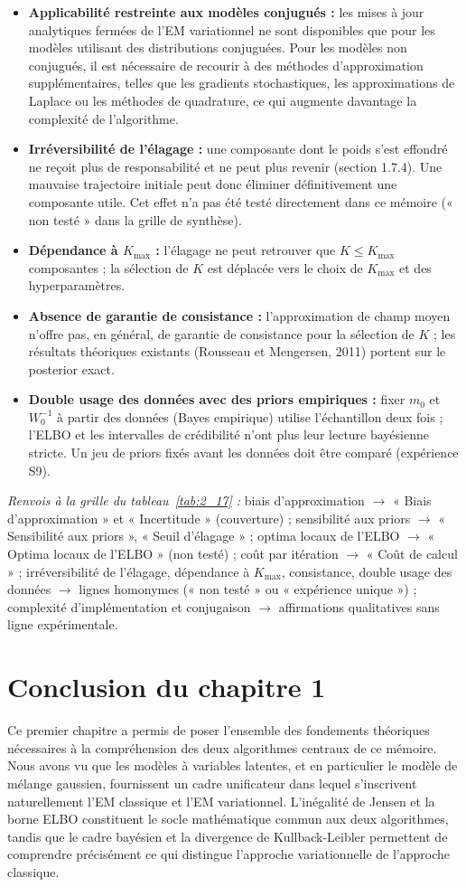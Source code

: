 \begin{itemize}
\item \textbf{Applicabilité restreinte aux modèles conjugués : }les mises à jour analytiques fermées de l'EM variationnel ne sont disponibles que pour les modèles utilisant des distributions conjuguées. Pour les modèles non conjugués, il est nécessaire de recourir à des méthodes d'approximation supplémentaires, telles que les gradients stochastiques, les approximations de Laplace ou les méthodes de quadrature, ce qui augmente davantage la complexité de l'algorithme.
\item \textbf{Irréversibilité de l'élagage : }une composante dont le poids s'est effondré ne reçoit plus de responsabilité et ne peut plus revenir (section 1.7.4). Une mauvaise trajectoire initiale peut donc éliminer définitivement une composante utile. Cet effet n'a pas été testé directement dans ce mémoire (« non testé » dans la grille de synthèse).
\item \textbf{Dépendance à $K_{\max}$ : }l'élagage ne peut retrouver que $K \leq K_{\max}$ composantes ; la sélection de $K$ est déplacée vers le choix de $K_{\max}$ et des hyperparamètres.
\item \textbf{Absence de garantie de consistance : }l'approximation de champ moyen n'offre pas, en général, de garantie de consistance pour la sélection de $K$ ; les résultats théoriques existants (Rousseau et Mengersen, 2011) portent sur le posterior exact.
\item \textbf{Double usage des données avec des priors empiriques : }fixer $m_0$ et $W_0^{-1}$ à partir des données (Bayes empirique) utilise l'échantillon deux fois ; l'ELBO et les intervalles de crédibilité n'ont plus leur lecture bayésienne stricte. Un jeu de priors fixés avant les données doit être comparé (expérience S9).
\end{itemize}
\par\noindent\emph{Renvois à la grille du tableau~\ref{tab:2_17} :} biais d'approximation $\to$ « Biais d'approximation » et « Incertitude » (couverture) ; sensibilité aux priors $\to$ « Sensibilité aux priors », « Seuil d'élagage » ; optima locaux de l'ELBO $\to$ « Optima locaux de l'ELBO » (non testé) ; coût par itération $\to$ « Coût de calcul » ; irréversibilité de l'élagage, dépendance à $K_{\max}$, consistance, double usage des données $\to$ lignes homonymes (« non testé » ou « expérience unique ») ; complexité d'implémentation et conjugaison $\to$ affirmations qualitatives sans ligne expérimentale.
\section{Conclusion du chapitre 1}
Ce premier chapitre a permis de poser l'ensemble des fondements théoriques nécessaires à la compréhension des deux algorithmes centraux de ce mémoire. Nous avons vu que les modèles à variables latentes, et en particulier le modèle de mélange gaussien, fournissent un cadre unificateur dans lequel s'inscrivent naturellement l'EM classique et l'EM variationnel. L'inégalité de Jensen et la borne ELBO constituent le socle mathématique commun aux deux algorithmes, tandis que le cadre bayésien et la divergence de Kullback-Leibler permettent de comprendre précisément ce qui distingue l'approche variationnelle de l'approche classique.

